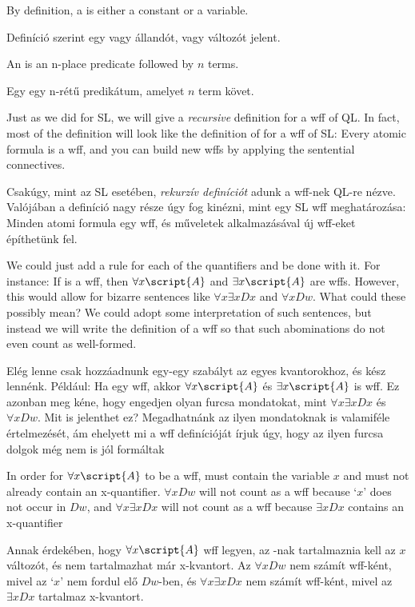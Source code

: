 By definition, a  is either a constant or a variable.

Definíció szerint egy  vagy állandót, vagy változót jelent.

An  is an n-place predicate followed by $n$ terms.

Egy  egy n-rétű predikátum, amelyet $n$ term követ.

Just as we did for SL, we will give a \emph{recursive} definition for a wff of QL. In fact, most of the definition will look like the definition of for a wff of SL: Every atomic formula is a wff, and you can build new wffs by applying the sentential connectives.

Csakúgy, mint az SL esetében, \emph{rekurzív definíciót} adunk a wff-nek QL-re nézve.
Valójában a definíció nagy része úgy fog kinézni, mint egy SL wff meghatározása: Minden
atomi formula egy wff, és műveletek alkalmazásával új wff-eket építhetünk fel.

We could just add a rule for each of the quantifiers and be done with it. For instance: If  is a wff, then $\forall x\script{A}$ and $\exists x\script{A}$ are wffs. However, this would allow for bizarre sentences like $\forall x\exists x Dx$ and $\forall x Dw$. What could these possibly mean? We could adopt some interpretation of such sentences, but instead we will write the definition of a wff so that such abominations do not even count as well-formed.

Elég lenne csak hozzáadnunk egy-egy szabályt az egyes kvantorokhoz, és kész lennénk. Például: Ha  egy wff, akkor $\forall x\script{A}$ és $\exists x\script{A}$ is wff. Ez azonban meg kéne, hogy engedjen olyan furcsa mondatokat, mint  $\forall x\exists x Dx$ és $\forall x Dw$. Mit is jelenthet ez? Megadhatnánk az ilyen mondatoknak is valamiféle értelmezését, ám ehelyett mi a wff definícióját írjuk úgy, hogy az ilyen furcsa dolgok még nem is jól formáltak

In order for $\forall x\script{A}$ to be a wff,  must contain the variable $x$ and must not already contain an x-quantifier. $\forall x Dw$ will not count as a wff because `$x$' does not occur in $Dw$, and $\forall x \exists x Dx$ will not count as a wff because $\exists x Dx$ contains an x-quantifier

Annak érdekében, hogy $\forall x\script{A}$ wff legyen, az -nak tartalmaznia kell az $x$ változót, és nem tartalmazhat már x-kvantort. Az $\forall x Dw$ nem számít wff-ként, mivel az `$x$' nem fordul elő $Dw$-ben, és $\forall x \exists x Dx$ nem számít wff-ként, mivel az $\exists x Dx$ tartalmaz x-kvantort.

